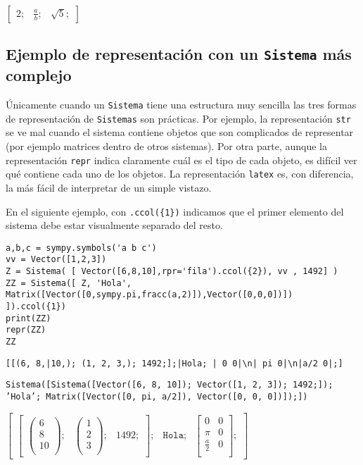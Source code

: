\documentclass[11pt]{report}
\begin{document}
\(\displaystyle \left[ \begin{array}{cc|c}2;& \frac{a}{b};& \sqrt{5};\end{array} \right]\)

\subsection{Ejemplo de representación con un \texttt{Sistema} más complejo}
\label{sec:org8c65177}
Únicamente cuando un \texttt{Sistema} tiene una estructura muy sencilla las
tres formas de representación de \texttt{Sistemas} son prácticas. Por
ejemplo, la representación \texttt{str} se ve mal cuando el sistema contiene
objetos que son complicados de representar (por ejemplo matrices
dentro de otros sistemas). Por otra parte, aunque la representación
\texttt{repr} indica claramente cuál es el tipo de cada objeto, es difícil
ver qué contiene cada uno de los objetos. La representación \texttt{latex}
es, con diferencia, la más fácil de interpretar de un simple vistazo.

En el siguiente ejemplo, con \texttt{.ccol(\{1\})} indicamos que el primer
elemento del sistema debe estar visualmente separado del resto.

\begin{verbatim}
a,b,c = sympy.symbols('a b c')
vv = Vector([1,2,3])
Z = Sistema( [ Vector([6,8,10],rpr='fila').ccol({2}), vv , 1492] ) 
ZZ = Sistema([ Z, 'Hola', Matrix([Vector([0,sympy.pi,fracc(a,2)]),Vector([0,0,0])])  ]).ccol({1})
print(ZZ)
repr(ZZ)
ZZ
\end{verbatim}

\texttt{[[(6, 8,|10,); (1, 2, 3,); 1492;];|Hola; |  0   0|\textbackslash{}n| pi   0|\textbackslash{}n|a/2   0|;]}

\texttt{Sistema([Sistema([Vector([6, 8, 10]); Vector([1, 2, 3]); 1492;]); 'Hola'; Matrix([Vector([0, pi, a/2]), Vector([0, 0, 0])]);])}

\(\displaystyle \left[ \begin{array}{c|cc}\left[ \begin{array}{ccc}\left( \begin{array}{c}6\\8\\ \hline 10\\ \end{array} \right);& \left( \begin{array}{c}1\\2\\3\\ \end{array} \right);& 1492;\end{array} \right];& \mathtt{\text{Hola}};& \left[ \begin{array}{cc}0&0\\\pi&0\\\frac{a}{2}&0\\ \end{array} \right];\end{array} \right]\)
\end{document}
